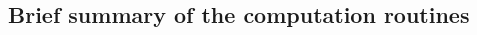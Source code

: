 \documentclass[10pt, a4paper]{article}
\begin{document}
\subsection*{Brief summary of the computation routines}
\begin{multicols}{2}






\end{multicols}
\end{document}
